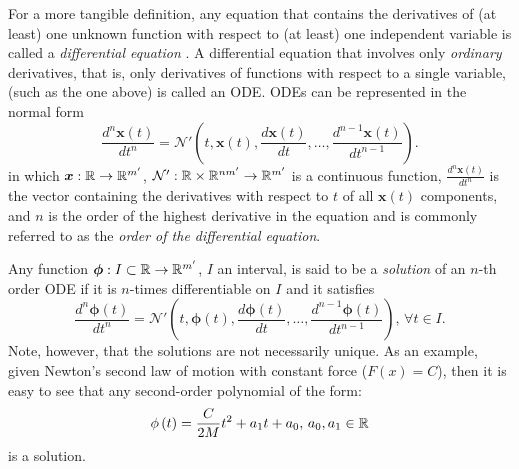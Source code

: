 For a more tangible definition, any equation that contains the derivatives of (at least) one unknown function with respect to (at least) one independent variable is called a \emph{differential equation} \cite{zill_first_2013}.
A differential equation that involves only \emph{ordinary} derivatives, that is, only derivatives of functions with respect to a single variable, (such as the one above) is called an \gls{ODE}.
\gls{ODE}s can be represented in the normal form \[
    \frac{d^n \bm{x}(t)}{d t^{n}} = \mathcal{N}'\left( t, \bm{x}\left( t \right), \frac{d \bm{x}(t)}{d t}, \ldots,\frac{d^{n-1}\bm{x}(t)}{d t^{n-1}} \right)
.\] 
in which $\bm{x}:\mathbb{R}\to \mathbb{R}^{m'} $, $\mathcal{N}':\mathbb{R}\times \mathbb{R}^{nm'}\to \mathbb{R}^{m'}$ is a continuous function, $\frac{d^n \bm{x}(t)}{d t^{n}}$ is the vector containing the derivatives with respect to $t$ of all $\bm{x}\left( t \right) $ components, and $n$ is the order of the highest derivative in the equation and is commonly referred to as the \emph{order of the differential equation}.

Any function $\bm{\phi}:I\subset\mathbb{R}\to \mathbb{R}^{m'}$, $I$ an interval, is said to be a \emph{solution} of an $n$-th order \gls{ODE} if it is $n$-times differentiable on $I$ and it satisfies \[
    \frac{d^n \bm{\phi}(t)}{d t^{n}} = \mathcal{N}'\left( t, \bm{\phi}\left( t \right) , \frac{d \bm{\phi}(t)}{d t}, \ldots,\frac{d^{n-1}\bm{\phi}(t)}{d t^{n-1}} \right),\,\forall t\in I
.\] Note, however, that the solutions are not necessarily unique.
As an example, given Newton's second law of motion with constant force ($F(x)=C$), then it is easy to see that any second-order polynomial of the form: \[
    \phi\left( t \right) = \frac{C}{2M}t^2 + a_1t + a_0,\, a_0,a_1\in \mathbb{R}
\] is a solution.

